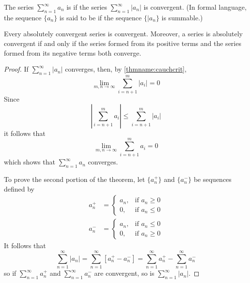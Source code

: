 \begin{defn}
    The series $\sum\limits_{n=1}^{\infty}a_n$ is  if the series $\sum\limits_{n=1}^{\infty}|a_n|$ is convergent. (In formal language, the sequence $\{a_n\}$ is said to be  if the sequence $\{|a_n\}$ is summable.)
\end{defn}

\begin{thm}\label{thm:absconv}
    Every absolutely convergent series is convergent. Moreover, a series is absolutely convergent if and only if the series formed from its positive terms and the series formed from its negative terms both converge.
\end{thm}
\begin{proof}
    If $\sum\limits_{n=1}^{\infty}|a_n|$ converges, then, by \ref{thmname:cauchcrit}, \begin{equation*}
        \lim\limits_{m,n\rightarrow \infty}\sum\limits_{i=n+1}^m|a_i| = 0
    \end{equation*}
    Since \begin{equation*}
        \left|\sum\limits_{i=n+1}^ma_i\right| \leq \sum\limits_{i=n+1}^m|a_i|
    \end{equation*}
    it follows that  \begin{equation*}
        \lim\limits_{m,n\rightarrow \infty}\sum\limits_{i=n+1}^ma_i = 0
    \end{equation*}
    which shows that $\sum\limits_{n=1}^{\infty}a_n$ converges.

    To prove the second portion of the theorem, let $\{a_n^+\}$ and $\{a_n^-\}$ be sequences defined by \begin{align*}
        a_n^+ &= \left\{\begin{array}{lc} a_n, & \text{if } a_n\geq 0 \\ 0, & \text{if } a_n \leq 0 \end{array}\right. \\
            a_n^- &= \left\{\begin{array}{lc} a_n, & \text{if } a_n\leq 0 \\ 0, & \text{if } a_n \geq 0 \end{array}\right.
    \end{align*}
    It follows that \begin{equation*}
        \sum\limits_{n=1}^{\infty}|a_n| = \sum\limits_{n=1}^{\infty}[a_n^+-a_n^-] = \sum\limits_{n=1}^{\infty}a_n^+ - \sum\limits_{n=1}^{\infty}a_n^-
    \end{equation*}
    so if $\sum\limits_{n=1}^{\infty}a_n^+$ and $\sum\limits_{n=1}^{\infty}a_n^-$ are convergent, so is $\sum\limits_{n=1}^{\infty}|a_n|$.



\end{proof}
